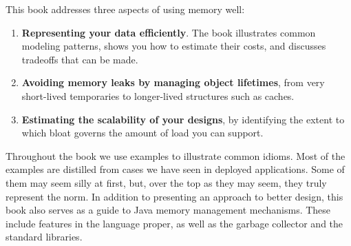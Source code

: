 This book addresses three aspects of using memory well:
\begin{enumerate}
	\item \textbf{Representing your data efficiently}. The book illustrates
	common modeling patterns, shows you how to estimate their costs, and
	discusses tradeoffs that can be made.
	\item \textbf{Avoiding memory leaks by managing object lifetimes}, from very
	short-lived temporaries to longer-lived structures such as caches.
	\item \textbf{Estimating the scalability of your designs}, by identifying the
	extent to which bloat governs the amount of load you can support.
\end{enumerate}
Throughout the book we use examples to illustrate common
idioms. Most of the examples are distilled from cases we have
seen in deployed applications. Some of them may seem silly at first, but, over
the top as they may seem, they truly represent the norm. 
In addition to presenting an approach to better design, this book also serves as
a guide to Java memory management mechanisms. These include features in the
language proper, as well as the garbage collector and the standard libraries. 

\begin{comment}
While the book is a collection of advice on practical topics, it is also
organized so as to give a systematic approach to memory issues. When read as a
whole it can be helpful in seeing the range of topics that need to be
considered, especially early in design. That does not mean that one must read
the whole book in order, or do a comprehensive analysis of every data structure
in your design, in order to get the benefit. The chapters are written to stand
on their own where possible, so that if a particular pattern comes up in your
code you can quickly get some ideas on costs and alternatives. At the same time,
familiarizing yourself with a few concepts in the Introduction will make the
reading much easier.
\end{comment}




